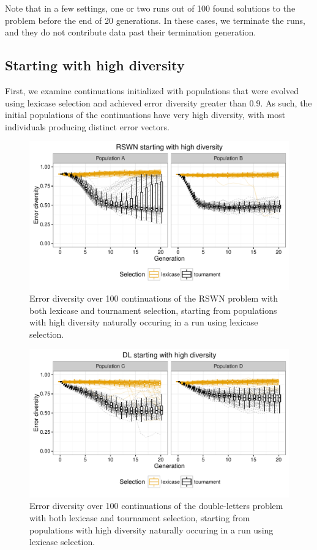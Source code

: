 \documentclass{sig-alternate-05-2015}
\begin{document}
Note that in a few settings, one or two runs out of 100 found solutions to the problem before the end of 20 generations. In these cases, we terminate the runs, and they do not contribute data past their termination generation.



\subsection{Starting with high diversity}
\label{sec:highDiversityResults}

First, we examine continuations initialized with populations that were evolved using lexicase selection and achieved error diversity greater than $0.9$. As such, the initial populations of the continuations have very high diversity, with most individuals producing distinct error vectors.

\begin{figure}
	\includegraphics{../figures/RSWN_high_diversity}
	\vspace{-1 cm}
	\caption{Error diversity over 100 continuations of the RSWN problem with both lexicase and tournament selection, starting from populations with high diversity naturally occuring in a run using lexicase selection.}
	\label{fig:RSWNhighDiversity}
\end{figure}

\begin{figure}
	\includegraphics{../figures/DL_high_diversity}
	\vspace{-1 cm}
	\caption{Error diversity over 100 continuations of the double-letters problem with both lexicase and tournament selection, starting from populations with high diversity naturally occuring in a run using lexicase selection.}
	\label{fig:DLhighDiversity}
\end{figure}
\end{document}
